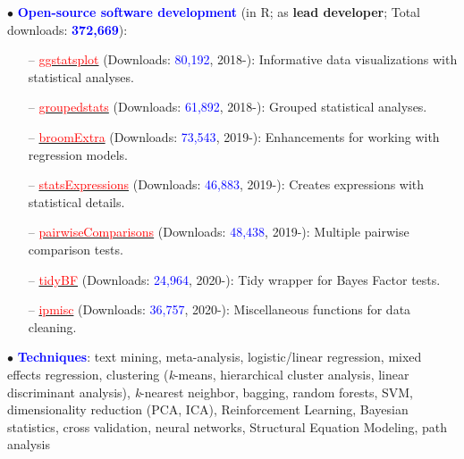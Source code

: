 \documentclass[10pt]{article}
\begin{document}
	$\bullet$ \textcolor{blue}{\textbf{Open-source software development}} (in R; as \textbf{lead developer}; Total downloads: \textcolor{blue}{\textbf{372,669}}):
	 \vspace*{-0.09in}
	 
	\begin{itemize}
	\itemsep-0.1em
	\item[--] \href{https://indrajeetpatil.github.io/ggstatsplot/}{\textcolor{red}{ggstatsplot}} (Downloads: \textcolor{blue}{80,192}, 2018-): Informative data visualizations with statistical analyses.
	\item[--] \href{https://indrajeetpatil.github.io/groupedstats/}{\textcolor{red}{groupedstats}} (Downloads: \textcolor{blue}{61,892}, 2018-): Grouped statistical analyses.
	\item[--] \href{https://indrajeetpatil.github.io/groupedstats/}{\textcolor{red}{broomExtra}} (Downloads: \textcolor{blue}{73,543}, 2019-): Enhancements for working with regression models.
	\item[--] \href{https://indrajeetpatil.github.io/statsExpressions/}{\textcolor{red}{statsExpressions}} (Downloads: \textcolor{blue}{46,883}, 2019-): Creates expressions with statistical details.
	\item[--] \href{https://indrajeetpatil.github.io/pairwiseComparisons/}{\textcolor{red}{pairwiseComparisons}} (Downloads: \textcolor{blue}{48,438}, 2019-): Multiple pairwise comparison tests.
    \item[--] \href{https://indrajeetpatil.github.io/tidyBF/}{\textcolor{red}{tidyBF}} (Downloads: \textcolor{blue}{24,964}, 2020-): Tidy wrapper for Bayes Factor tests.
	\item[--] \href{https://indrajeetpatil.github.io/ipmisc/}{\textcolor{red}{ipmisc}} (Downloads: \textcolor{blue}{36,757}, 2020-): Miscellaneous functions for data cleaning.	
	\end{itemize}

	$\bullet$ \textcolor{blue}{\textbf{Techniques}}: text mining, meta-analysis, logistic/linear regression, mixed effects regression, clustering \hspace*{0.1in}(\textit{k}-means, hierarchical cluster analysis, linear discriminant analysis), \textit{k}-nearest neighbor, bagging, random \hspace*{0.1in}forests, SVM, dimensionality reduction (PCA, ICA), Reinforcement Learning, Bayesian statistics, cross \hspace*{0.1in}validation, neural networks, Structural Equation Modeling, path analysis
	\miniskip
	
\end{document}

